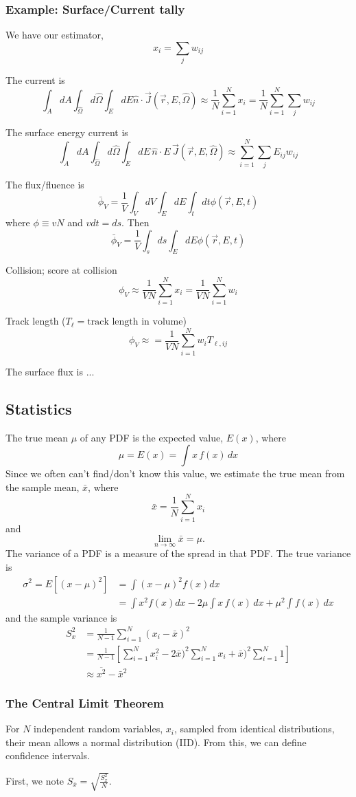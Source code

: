 \documentclass{report}
\newcommand{\hh}[1]{\subsection*{#1}}
\newcommand{\hhh}[1]{\subsubsection*{#1}}
\newcommand{\pos}{\vec{r}}
\newcommand{\cur}{\vec{J}}
\newcommand{\Oh}{\hat{\Omega}}
\newcommand{\rEO}{(\pos,E,\Oh)}
\newcommand{\rEt}{(\pos,E,t)}
\begin{document}
\hhh{Example: Surface/Current tally}
We have our estimator,
$$ x_i = \sum_j w_{ij} $$

The current is 
$$ \int_A dA \int_{\Oh} d\Oh \int_E dE \hat{n}\cdot \cur\rEO \approx \frac{1}{N} \sum_{i=1}^N x_i = \frac{1}{N} \sum_{i=1}^N \sum_j w_{ij}$$

The surface energy current is
$$ \int_A dA \int_{\Oh} d\Oh \int_E dE \, \hat{n}\cdot E\,\cur\rEO \approx \sum_{i=1}^N \sum_j E_{ij} w_{ij} $$

The flux/fluence is
$$ \bar{\phi}_V = \frac{1}{V} \int_V dV \int_E dE \int_t dt \phi\rEt $$
where $ \phi \equiv vN$ and $v dt = ds$. Then
$$ \bar{\phi}_V = \frac{1}{V} \int_s ds \int_E dE \phi\rEt $$ 

Collision; score at collision 
$$ \phi_V \approx \frac{1}{VN} \sum_{i=1}^N x_i = \frac{1}{VN} \sum_{i=1}^N w_i $$

Track length ($T_{\ell} = \text{track length in volume}$)
$$ \phi_V \approx = \frac{1}{VN} \sum_{i=1}^N w_i T_{\ell,ij} $$
 
The surface flux is ...

\hh{Statistics}

The true mean $\mu$ of any PDF is the expected value, $E(x)$, where
$$ \mu = E(x) = \int x \, f(x) \, dx $$
Since we often can't find/don't know this value, we estimate the true mean from the sample mean, $\bar{x}$, where
$$ \bar{x} = \frac{1}{N}\sum_{i=1}^N x_i $$
and 
$$ \lim_{n\rightarrow\infty} \bar{x} = \mu .$$
The variance of a PDF is a measure of the spread in that PDF. The true variance is
\begin{align*}
\sigma^2 = E[(x-\mu)^2] &= \int (x-\mu)^2 f(x) dx \\
						&= \int x^2 f(x) dx - 2\mu \int x \, f(x) \, dx + \mu^2 \int f(x) \, dx
\end{align*}
and the sample variance is 
\begin{align*}
S_x^2	&= \frac{1}{N-1}\sum_{i=1}^N (x_i - \bar{x})^2 \\
		&= \frac{1}{N-1}\left[ \sum_{i=1}^N x_i^2 - 2\bar{x})^2 \sum_{i=1}^N x_i + \bar{x})^2 \sum_{i=1}^N 1 \right] \\
		&\approx \overline{x^2} - \bar{x}^2
\end{align*}

\hhh{The Central Limit Theorem}
For $N$ independent random variables, $x_i$, sampled from identical distributions, their mean allows a normal distribution (IID). From this, we can define confidence intervals.

First, we note $S_{\bar{x}} = \sqrt{\frac{S_x^2}{N}}$.
\end{document}
